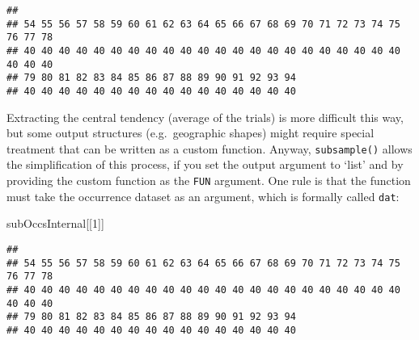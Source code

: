 \documentclass[]{article}
\newenvironment{Shaded}{\begin{snugshade}}{\end{snugshade}}
\newcommand{\KeywordTok}[1]{\textcolor[rgb]{0.13,0.29,0.53}{\textbf{{#1}}}}
\newcommand{\DataTypeTok}[1]{\textcolor[rgb]{0.13,0.29,0.53}{{#1}}}
\newcommand{\DecValTok}[1]{\textcolor[rgb]{0.00,0.00,0.81}{{#1}}}
\newcommand{\StringTok}[1]{\textcolor[rgb]{0.31,0.60,0.02}{{#1}}}
\newcommand{\NormalTok}[1]{{#1}}
\begin{document}
\begin{verbatim}
## 
## 54 55 56 57 58 59 60 61 62 63 64 65 66 67 68 69 70 71 72 73 74 75 76 77 78 
## 40 40 40 40 40 40 40 40 40 40 40 40 40 40 40 40 40 40 40 40 40 40 40 40 40 
## 79 80 81 82 83 84 85 86 87 88 89 90 91 92 93 94 
## 40 40 40 40 40 40 40 40 40 40 40 40 40 40 40 40
\end{verbatim}

Extracting the central tendency (average of the trials) is more
difficult this way, but some output structures (e.g.~geographic shapes)
might require special treatment that can be written as a custom
function. Anyway, \texttt{subsample()} allows the simplification of this
process, if you set the output argument to `list' and by providing the
custom function as the \texttt{FUN} argument. One rule is that the
function must take the occurrence dataset as an argument, which is
formally called \texttt{dat}:

\begin{Shaded}
\end{Shaded}

\begin{Shaded}
\begin{Highlighting}[]
\NormalTok{subOccsInternal[[}\DecValTok{1}\NormalTok{]]}
\end{Highlighting}
\end{Shaded}

\begin{verbatim}
## 
## 54 55 56 57 58 59 60 61 62 63 64 65 66 67 68 69 70 71 72 73 74 75 76 77 78 
## 40 40 40 40 40 40 40 40 40 40 40 40 40 40 40 40 40 40 40 40 40 40 40 40 40 
## 79 80 81 82 83 84 85 86 87 88 89 90 91 92 93 94 
## 40 40 40 40 40 40 40 40 40 40 40 40 40 40 40 40
\end{verbatim}
\end{document}
